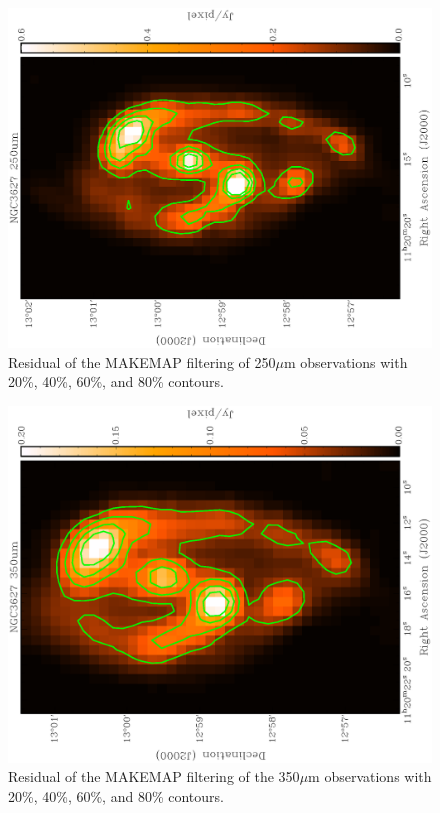 \begin{figure}
  \centering
  \label{fig_250}
  \includegraphics[width=1.\textwidth,angle=270]{obs_imgs/250_um.eps}
  \caption[NGC3627 250$\mu$m Observations]{Residual of the MAKEMAP filtering of 250$\mu$m observations with 20\%, 40\%, 60\%, and 80\% contours.}
\end{figure}

\begin{figure}
  \centering
  \label{fig_350}
  \includegraphics[width=1.\textwidth,angle=270]{obs_imgs/350_um.eps}
  \caption[NGC3627 350$\mu$m Observations]{Residual of the MAKEMAP filtering of the 350$\mu$m observations with 20\%, 40\%, 60\%, and 80\% contours.}
\end{figure}

